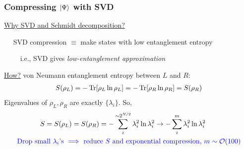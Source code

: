 \documentclass{beamer}
\theoremstyle{definition}
\begin{document}
\begin{frame}
	\frametitle{Compressing $\ket{\Psi}$ with SVD}
	
	\underline{Why SVD and Schmidt decomposition?} \\
	
	\vspace{8pt}
	
	$\quad$ SVD compression $\equiv$ make states with low entanglement entropy\\
	
	\vspace{8pt}
	
	\indent $\quad\quad$ i.e., SVD gives \textit{low-entanglement approximation}\\
	
	\vspace{8pt}
	
	\underline{How?} von Neumann entanglement entropy between $L$ and $R$:
	\begin{align*}
		S(\rho_L) = -\Tr[\rho_L \ln \rho_L] = -\Tr[\rho_R \ln \rho_R] = S(\rho_R) 
	\end{align*}
	Eigenvalues of $\rho_L, \rho_R$ are exactly $\{\lambda_i\}$. So,
	\vspace{-7pt}
	\begin{align*}
		&\quad\quad \quad \,\, S = S(\rho_L) = S(\rho_R) = -\sum_i^{\sim 2^{N/2}} \lambda_i^2 \ln \lambda_i^2 \to -\sum_i^m \lambda_i^2 \ln \lambda_i^2\\
		&\text{\textcolor{blue}{Drop small $\lambda_i$'s $\implies$ reduce $S$ and exponential compression, $m\sim \mathcal{O}(100)$}}
	\end{align*}
	
\end{frame}
\end{document}

